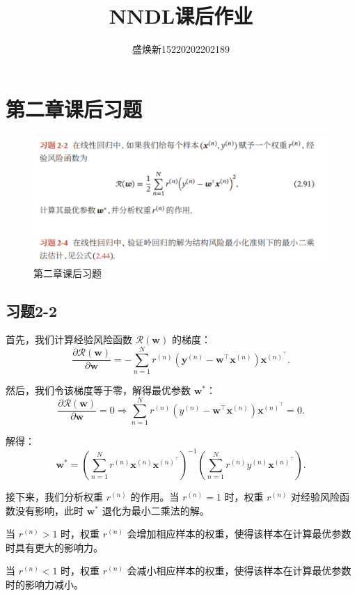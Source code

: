 \documentclass[]{article}
\title{NNDL课后作业}
\author{盛焕新15220202202189}
\begin{document}
\maketitle


\section{第二章课后习题}
\begin{figure}[H]
	\centering
	\includegraphics[width=1\linewidth]{第二章课后习题}
	\caption{第二章课后习题}
	\label{fig:}
\end{figure}
\subsection{习题2-2}
首先，我们计算经验风险函数 $\mathcal{R}(\boldsymbol{w})$ 的梯度：
$$
\frac{\partial \mathcal{R}(\boldsymbol{w})}{\partial \boldsymbol{w}} = - \sum_{n=1}^N r^{(n)} \left( \mathbf{y}^{(n)} - \boldsymbol{w}^{\top} \mathbf{x}^{(n)} \right) \mathbf{x}^{(n)^{\top}}.
$$

然后，我们令该梯度等于零，解得最优参数 $\boldsymbol{w}^*$：
$$
\frac{\partial \mathcal{R}(\boldsymbol{w})}{\partial \boldsymbol{w}} = 0 \Rightarrow \sum_{n=1}^N r^{(n)} \left( y^{(n)} - \mathbf{w}^{\top} \mathbf{x}^{(n)} \right) \mathbf{x}^{(n)^{\top}} = 0.
$$

解得：
$$
\mathbf{w}^* = \left( \sum_{n=1}^N r^{(n)} \mathbf{x}^{(n)} \mathbf{x}^{(n)^{\top}} \right)^{-1} \left( \sum_{n=1}^N r^{(n)} y^{(n)} \mathbf{x}^{(n)^{\top}} \right).
$$

接下来，我们分析权重 $r^{(n)}$ 的作用。当 $r^{(n)} = 1$ 时，权重 $r^{(n)}$ 对经验风险函数没有影响，此时 $\mathbf{w}^*$ 退化为最小二乘法的解。

当 $r^{(n)} > 1$ 时，权重 $r^{(n)}$ 会增加相应样本的权重，使得该样本在计算最优参数时具有更大的影响力。

当 $r^{(n)} < 1$ 时，权重 $r^{(n)}$ 会减小相应样本的权重，使得该样本在计算最优参数时的影响力减小。
\end{document}
